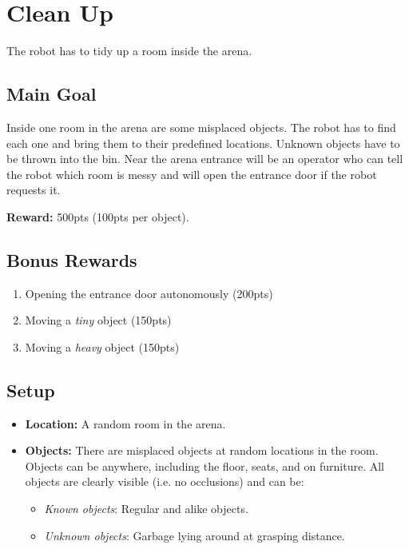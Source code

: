 \section{Clean Up}
The robot has to tidy up a room inside the arena.


\subsection{Main Goal}
Inside one room in the arena are some misplaced objects. The robot has to find each one and bring them to their predefined locations. Unknown objects have to be thrown into the bin. Near the arena entrance will be an operator who can tell the robot which room is messy and will open the entrance door if the robot requests it.

\noindent\textbf{Reward:} 500pts (100pts per object).

\subsection{Bonus Rewards}
\begin{enumerate}[nosep]
	\item Opening the entrance door autonomously (200pts)
	\item Moving a \emph{tiny} object (150pts)
	\item Moving a \emph{heavy} object (150pts)
\end{enumerate}


\subsection{Setup}
\begin{itemize}[nosep]
	\item \textbf{Location:} A random room in the arena.

	\item \textbf{Objects:} There are misplaced objects at random locations in the room.
	Objects can be anywhere, including the floor, seats, and on furniture.
	All objects are clearly visible (i.e. no occlusions) and can be:
	\begin{itemize}[nosep]
		\item\textit{Known objects}: Regular and alike objects.
		\item\textit{Unknown objects}: Garbage lying around at grasping distance.
	\end{itemize}
\end{itemize}

